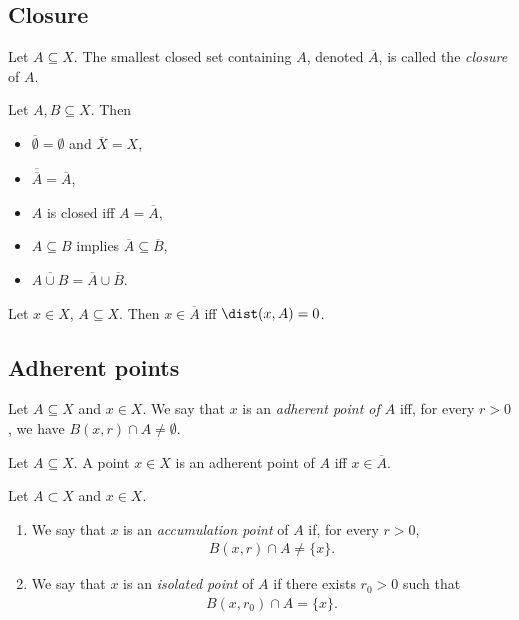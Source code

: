 \documentclass{article}
\begin{document}
\subsection{Closure}

\begin{definition}
	Let $A\subseteq X$. The smallest closed set containing $A$, denoted $\overline A$, is called
	the \emph{closure} of $A$.
\end{definition}

\begin{proposition}[4.26]
	Let $A,B\subseteq X$. Then
	\begin{itemize}
		\item $\overline\emptyset = \emptyset$ and $\overline X = X$,
		\item $\overline{\overline A} = \overline A$,
		\item $A$ is closed iff $A=\overline A$,
		\item $A\subseteq B$ implies $\overline A\subseteq\overline B$,
		\item $\overline{A\cup B} = \overline A \cup \overline B$.
	\end{itemize}
\end{proposition}

\begin{theorem}
	Let $x\in X$, $A\subseteq X$. Then $x\in\overline A$ iff $\dist(x,A)=0$.
\end{theorem}

\subsection{Adherent points}

\begin{definition}[4.27]
	Let $A\subseteq X$ and $x\in X$. We say that $x$ is an \emph{adherent point of $A$}
	iff, for every $r>0$, we have $B(x,r)\cap A\not=\emptyset$.
\end{definition}

\begin{proposition}[4.29]
	Let $A\subseteq X$. A point $x\in X$ is an adherent point of $A$ iff
	$x\in\overline A$.
\end{proposition}

\begin{definition}
	Let $A\subset X$ and $x\in X$.
	\begin{enumerate}
		\item We say that $x$ is an \emph{accumulation point} of $A$ if, for every $r>0$,
		      \begin{align*}
			      B(x,r)\cap A\not=\{x\}.
		      \end{align*}
		\item We say that $x$ is an \emph{isolated point} of $A$ if there exists $r_0>0$
		      such that \begin{align*}
			      B(x,r_0)\cap A = \{x\}.
		      \end{align*}
	\end{enumerate}
\end{definition}
\end{document}
